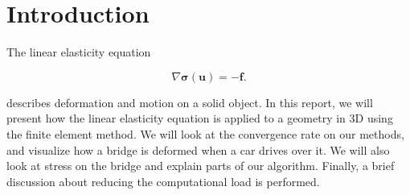 \section{Introduction}



The linear elasticity equation

\begin{equation}
\label{eq:linEl}
\nabla \bm{\sigma}(\bm{u}) = - \bm{f}.
\end{equation}

describes deformation and motion on a solid object. In this report, we will present how the linear elasticity equation is applied to a geometry in 3D using the finite element method. We will look at the convergence rate on our methods, and visualize how a bridge is deformed when a car drives over it. We will also look at stress on the bridge and explain parts of our algorithm. Finally, a brief discussion about reducing the computational load is performed.